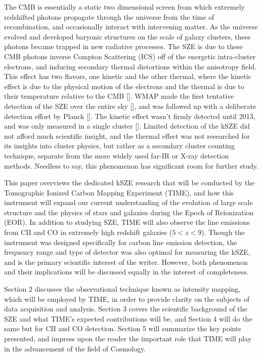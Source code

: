 \documentclass[manuscript]{aastex}
\begin{document}
 The CMB is essentially a static two dimensional screen from which extremely redshifted photons propagate through the universe from the time of recombination, and occasionally interact with intervening matter. As the universe evolved and developed baryonic structures on the scale of galaxy clusters, these photons became trapped in new radiative processes. The SZE is due to these CMB photons inverse Compton Scattering (ICS) off of the energetic intra-cluster electrons, and inducing secondary thermal distortions within the anisotropy field. This effect has two flavors, one kinetic and the other thermal, where the kinetic effect is due to the physical motion of the electrons and the thermal is due to their temperature relative to the CMB [\cite{Sunyaev1970}]. WMAP made the first tentative detection of the SZE over the entire sky [\cite{Bond2003}], and was followed up with a deliberate detection effort by Planck [\cite{Planck2013}]. The kinetic effect wasn't firmly detected until 2013, and was only measured in a single cluster [\cite{Sayers2013}]. Limited detection of the kSZE did not afford much scientific insight, and the thermal effect was not researched for its insights into cluster physics, but rather as a secondary cluster counting technique, separate from the more widely used far-IR or X-ray detection methods. Needless to say, this phenomenon has significant room for further study.
 
This paper overviews the dedicated kSZE research that will be conducted by the Tomographic Ionized Carbon Mapping Experiment (TIME), and how this instrument will expand our current understanding of the evolution of large scale structure and the physics of stars and galaxies during the Epoch of Reionization (EOR). In addition to studying SZE, TIME will also observe the line emissions from CII and CO in extremely high redshift galaxies ($5 < z < 9$). Though the instrument was designed specifically for carbon line emission detection, the frequency range and type of detector was also optimal for measuring the kSZE, and is the primary scientific interest of the writer. However, both phenomenon and their implications will be discussed equally in the interest of completeness. 
 
Section 2 discusses the observational technique known as intensity mapping, which will be employed by TIME, in order to provide clarity on the subjects of data acquisition and analysis. Section 3 covers the scientific background of the SZE and what TIME's expected contributions will be, and Section 4 will do the same but for CII and CO detection. Section 5 will summarize the key points presented, and impress upon the reader the important role that TIME will play in the advancement of the field of Cosmology. 
 
\end{document}
